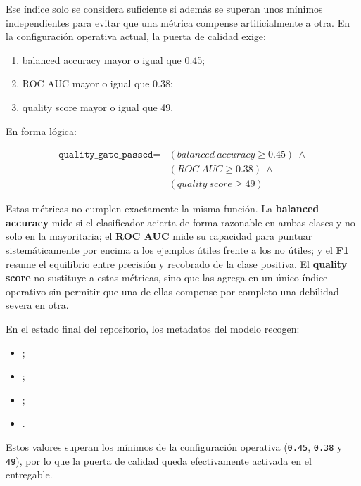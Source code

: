 Ese índice solo se considera suficiente si además se superan unos mínimos
independientes para evitar que una métrica compense artificialmente a otra. En
la configuración operativa actual, la puerta de calidad exige:

\begin{enumerate}
    \item balanced accuracy mayor o igual que 0.45;
    \item ROC AUC mayor o igual que 0.38;
    \item quality score mayor o igual que 49.
\end{enumerate}

En forma lógica:

\[
\begin{aligned}
\texttt{quality\_gate\_passed} ={}&
(balanced\ accuracy \geq 0.45)\ \land \\
& (ROC\ AUC \geq 0.38)\ \land \\
& (quality\ score \geq 49)
\end{aligned}
\]

Estas métricas no cumplen exactamente la misma función. La
\textbf{balanced accuracy} mide si el clasificador acierta de forma razonable
en ambas clases y no solo en la mayoritaria; el \textbf{ROC AUC} mide su
capacidad para puntuar sistemáticamente por encima a los ejemplos útiles frente
a los no útiles; y el \textbf{F1} resume el equilibrio entre precisión y
recobrado de la clase positiva. El \textbf{quality score} no sustituye a estas
métricas, sino que las agrega en un único índice operativo sin permitir que una
de ellas compense por completo una debilidad severa en otra.

En el estado final del repositorio, los metadatos del modelo recogen:

\begin{itemize}
    \item \texttt{};
    \item \texttt{};
    \item \texttt{};
    \item \texttt{}.
\end{itemize}

Estos valores superan los mínimos de la configuración operativa
(\texttt{0.45}, \texttt{0.38} y \texttt{49}), por lo que la puerta de calidad
queda efectivamente activada en el entregable.

